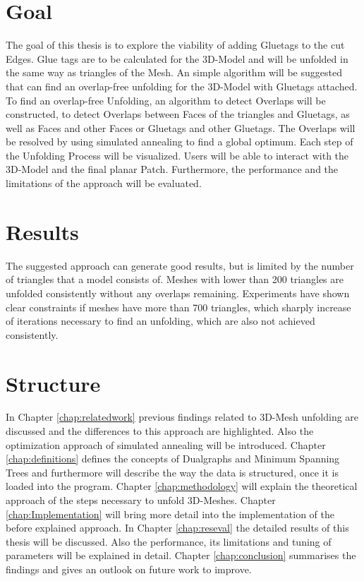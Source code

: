 \documentclass[draft,final]{vutinfth} %
\begin{document}
\section{Goal}
The goal of this thesis is to explore the viability of adding Gluetags to the cut Edges. Glue tags are to be calculated for the 3D-Model and will be unfolded in the same way as triangles of the Mesh. An simple algorithm will be suggested that can find an overlap-free unfolding for the 3D-Model with Gluetags attached. To find an overlap-free Unfolding, an algorithm to detect Overlaps will be constructed, to detect Overlaps between Faces of the triangles and Gluetags, as well as Faces and other Faces or Gluetags and other Gluetags.
The Overlaps will be resolved by using simulated annealing to find a global optimum. Each step of the Unfolding Process will be visualized. Users will be able to interact with the 3D-Model and the final planar Patch. Furthermore, the performance and the limitations of the approach will be evaluated.

\section{Results}
The suggested approach can generate good results, but is limited by the number of triangles that a model consists of. Meshes with lower than 200 triangles are unfolded consistently without any overlaps remaining. Experiments have shown clear constraints if meshes have more than 700 triangles, which sharply increase of iterations necessary to find an unfolding, which are also not achieved consistently.

\section{Structure}
In Chapter \ref{chap:relatedwork} previous findings related to 3D-Mesh unfolding are discussed and the differences to this approach are highlighted. Also the optimization approach of simulated annealing will be introduced. Chapter \ref{chap:definitions} defines the concepts of Dualgraphs and Minimum Spanning Trees and furthermore will describe the way the data is structured, once it is loaded into the program. Chapter \ref{chap:methodology} will explain the theoretical approach of the steps necessary to unfold 3D-Meshes. Chapter \ref{chap:Implementation} will bring more detail into the implementation of the before explained approach. In Chapter \ref{chap:reseval} the detailed results of this thesis will be discussed. Also the performance, its limitations and tuning of parameters will be explained in detail. Chapter \ref{chap:conclusion} summarises the findings and gives an outlook on future work to improve.
\end{document}
